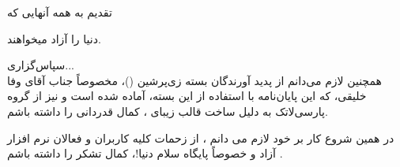 \clearpage\newpage
 \thispagestyle{empty}
\vspace{4cm}

{\nastaliq
{\Huge
\hspace{1cm}
 تقدیم به همه آنهایی که 
\vspace{1.5cm}

\hspace{4cm}
دنیا را
 آزاد
  میخواهند.
}}

\newpage



\newpage\thispagestyle{empty}
{\nastaliq
سپاس‌گزاری...
}
\\[2cm]

همچنین لازم می‌دانم از پدید آورندگان بسته زی‌پرشین (\lr{\XePersian})، مخصوصاً جناب آقای  وفا خلیقی، که این پایان‌نامه با استفاده از این بسته، آماده شده است و نیز از  گروه پارسی‌لاتک  به دلیل ساخت قالب زیبای  \lr{\LaTeX}،  کمال قدردانی را داشته باشم.

در همین شروع کار بر خود لازم می دانم ، از زحمات  کلیه  کاربران  و فعالان نرم افزار آزاد  و خصوصاً پایگاه سلام دنیا!، کمال تشکر را داشته باشم .

\newpage

